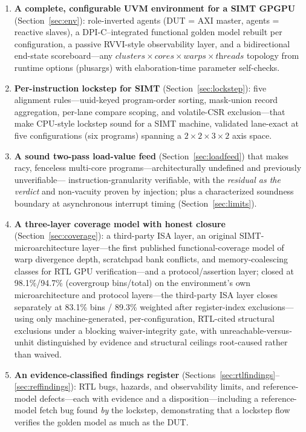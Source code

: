 \documentclass[conference]{IEEEtran}
\newcommand{\code}[1]{\texttt{\detokenize{#1}}}
\begin{document}
\begin{enumerate}
	\item \textbf{A complete, configurable UVM environment for a SIMT
		      GPGPU} (Section~\ref{sec:env}): role-inverted agents (DUT = AXI master,
	      agents = reactive slaves), a DPI-C--integrated functional golden model
	      rebuilt per configuration, a passive RVVI-style observability layer,
	      and a bidirectional end-state scoreboard---any
	      $\textit{clusters}\times\textit{cores}\times\textit{warps}\times\textit{threads}$
	      topology from runtime options (plusargs) with elaboration-time parameter
	      self-checks.
	\item \textbf{Per-instruction lockstep for SIMT}
	      (Section~\ref{sec:lockstep}): five alignment rules---uuid-keyed
	      program-order sorting, mask-union record aggregation, per-lane compare
	      scoping, and volatile-CSR exclusion---that make CPU-style lockstep sound
	      for a SIMT machine, validated lane-exact at five configurations
	      (six programs)
	      spanning a $2\times2\times3\times2$ axis space.
	\item \textbf{A sound two-pass load-value feed}
	      (Section~\ref{sec:loadfeed}) that makes racy, fenceless multi-core
	      programs---architecturally undefined and previously unverifiable---%
	      instruction-granularity verifiable, with the \emph{residual as the
		      verdict} and non-vacuity proven by injection; plus a characterized
	      soundness boundary at asynchronous interrupt timing
	      (Section~\ref{sec:limits}).
	\item \textbf{A three-layer coverage model with honest closure}
	      (Section~\ref{sec:coverage}): a third-party ISA layer, an original
	      SIMT-microarchitecture layer---the first published functional-coverage
	      model of warp divergence depth, scratchpad bank conflicts, and
	      memory-coalescing classes for RTL GPU verification---and a
	      protocol/assertion layer; closed at 98.1\%/94.7\% (covergroup
	      bins/total) on the environment's own microarchitecture and
	      protocol layers---the third-party ISA layer closes separately
	      at 83.1\% bins / 89.3\% weighted after register-index
	      exclusions---using only machine-generated,
	      per-configuration, RTL-cited structural exclusions under a blocking
	      waiver-integrity gate, with unreachable-versus-unhit distinguished by
	      evidence and structural ceilings root-caused rather than waived.
	\item \textbf{An evidence-classified findings register}
	      (Sections~\ref{sec:rtlfindings}--\ref{sec:reffindings}): RTL bugs,
	      hazards, and observability limits, and reference-model defects---each
	      with \code{file:line} evidence and a disposition---including a
	      reference-model fetch bug found \emph{by} the lockstep, demonstrating
	      that a lockstep flow verifies the golden model as much as the DUT.
\end{enumerate}
\end{document}
